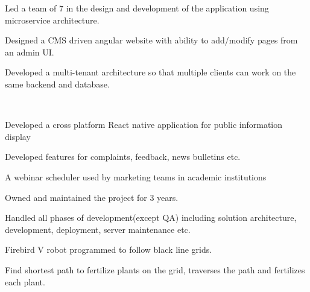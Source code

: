 \documentclass[]{deedy-resume-openfont}
\begin{document}
\begin{minipage}[t]{0.66\textwidth}
\begin{tightemize}
    \item Led a team of 7 in the design and development of the application using microservice architecture.
    \item Designed a CMS driven angular website with ability to add/modify pages from an admin UI. 
    \item Developed a multi-tenant architecture so that multiple clients can work on the same backend and database.
\end{tightemize}
\sectionsep


\\
\begin{tightemize}
    \item Developed a cross platform React native application for public information display
    \item Developed features for complaints, feedback, news bulletins etc.
\end{tightemize}
\sectionsep

\begin{tightemize}
    \item A webinar scheduler used by marketing teams in academic institutions
    \item Owned and maintained the project for 3 years.
    \item Handled all phases of development(except QA) including solution architecture, development, deployment, server maintenance etc.
\end{tightemize}
\sectionsep

\begin{tightemize}
    \item Firebird V robot programmed to follow black line grids.
    \item Find shortest path to fertilize plants on the grid, traverses the path and fertilizes each plant.
\end{tightemize}
\sectionsep



\end{minipage}
\end{document}
